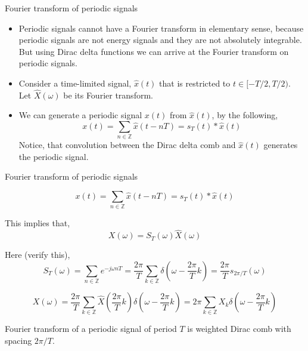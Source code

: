 \documentclass{beamer}
\begin{document}
\begin{frame}{Fourier transform of periodic signals}
\begin{itemize}
\item Periodic signals cannot have a Fourier transform in elementary sense, because periodic signals are not energy signals and they are not absolutely integrable. But using Dirac delta functions we can arrive at the Fourier transform on periodic signals.
\item Consider a time-limited signal, $\hat{x}(t)$ that is restricted to $t \in [-T/2, T/2)$. Let $\hat{X}(\omega)$ be its Fourier transform.
\item We can generate a periodic signal $x(t)$ from $\hat{x}(t)$, by the following,
\[ x(t) = \sum_{n\in\mathbb{Z}}\hat{x}(t - nT) = s_T(t) * \hat{x}(t) \]
Notice, that convolution between the Dirac delta comb and $\hat{x}(t)$ generates the periodic signal.
\end{itemize}
\end{frame}

\begin{frame}{Fourier transform of periodic signals}

\[ x(t) = \sum_{n\in\mathbb{Z}}\hat{x}(t - nT) = s_T(t) * \hat{x}(t) \]

This implies that,
\[ X(\omega) = S_T(\omega)\hat{X}(\omega) \]

Here (verify this),
\[ S_T(\omega) = \sum_{n\in\mathbb{Z}}e^{-j\omega nT} = \frac{2\pi}{T}\sum_{k\in\mathbb{Z}}\delta\left(\omega - \frac{2\pi}{T}k\right) = \frac{2\pi}{T}s_{2\pi/T}\left(\omega\right) \]

\[ X(\omega) = \frac{2\pi}{T}\sum_{k\in\mathbb{Z}}\hat{X}\left(\frac{2\pi}{T}k\right)\delta\left(\omega - \frac{2\pi}{T}k\right) = 2\pi\sum_{k\in\mathbb{Z}}X_k\delta\left(\omega - \frac{2\pi}{T}k\right) \]

Fourier transform of a periodic signal of period $T$ is weighted Dirac comb with spacing $2\pi/T$.

\end{frame}
\end{document}
